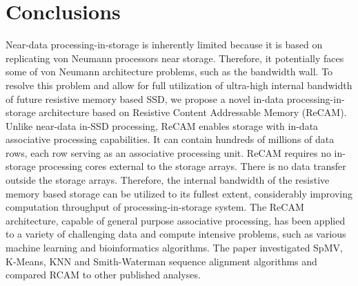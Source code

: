 \documentclass{superfri}
\begin{document}
\section{Conclusions}

Near-data processing-in-storage is inherently limited because it is based on replicating von Neumann processors near storage. Therefore, it potentially faces some of von Neumann architecture problems, such as the bandwidth wall. To resolve this problem and allow for full utilization of ultra-high internal bandwidth of future resistive memory based SSD, we propose a novel in-data processing-in-storage architecture based on Resistive Content Addressable Memory (ReCAM). Unlike near-data in-SSD processing, ReCAM enables storage with in-data associative processing capabilities. It can contain hundreds of millions of data rows, each row serving as an associative processing unit. ReCAM requires no in-storage processing cores external to the storage arrays. There is no data transfer outside the storage arrays. Therefore, the internal bandwidth of the resistive memory based storage can be utilized to its fullest extent, considerably improving computation throughput of processing-in-storage system.
The ReCAM architecture, capable of general purpose associative processing, has been applied to a variety of challenging data and compute intensive problems, such as various machine learning and bioinformatics algorithms. The paper investigated SpMV, K-Means, KNN and Smith-Waterman sequence alignment algorithms and compared RCAM to other published analyses. 




\end{document}
